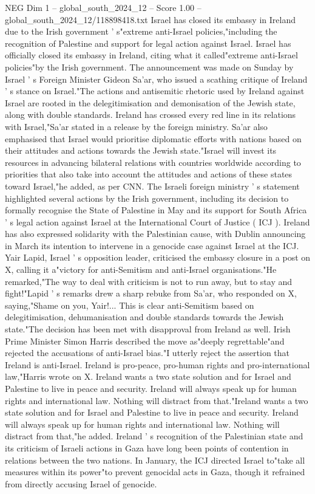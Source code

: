 \begin{textsample}{NEG Dim 1 – global\_south\_2024\_12 – Score 1.00 – global\_south\_2024\_12/118898418.txt}  \label{ex:f1_neg_346}
Israel has closed its embassy in Ireland due to the Irish government ' s"extreme anti-Israel policies,"including the recognition of Palestine and support for legal action against Israel.
Israel has officially closed its embassy in Ireland, citing what it called"extreme anti-Israel policies"by the Irish government.
The announcement was made on Sunday by Israel ' s Foreign Minister Gideon Sa'ar, who issued a scathing critique of Ireland ' s stance on Israel."The actions and antisemitic rhetoric used by Ireland against Israel are rooted in the delegitimisation and demonisation of the Jewish state, along with double standards.
Ireland has crossed every red line in its relations with Israel,"Sa'ar stated in a release by the foreign ministry.
Sa'ar also emphasised that Israel would prioritise diplomatic efforts with nations based on their attitudes and actions towards the Jewish state."Israel will invest its resources in advancing bilateral relations with countries worldwide according to priorities that also take into account the attitudes and actions of these states toward Israel,"he added, as per CNN.
The Israeli foreign ministry ' s statement highlighted several actions by the Irish government, including its decision to formally recognise the State of Palestine in May and its support for South Africa ' s legal action against Israel at the International Court of Justice ( ICJ ).
Ireland has also expressed solidarity with the Palestinian cause, with Dublin announcing in March its intention to intervene in a genocide case against Israel at the ICJ.
Yair Lapid, Israel ' s opposition leader, criticised the embassy closure in a post on X, calling it a"victory for anti-Semitism and anti-Israel organisations."He remarked,"The way to deal with criticism is not to run away, but to stay and fight!"Lapid ' s remarks drew a sharp rebuke from Sa'ar, who responded on X, saying,"Shame on you, Yair!...
This is clear anti-Semitism based on delegitimisation, dehumanisation and double standards towards the Jewish state."The decision has been met with disapproval from Ireland as well.
Irish Prime Minister Simon Harris described the move as"deeply regrettable"and rejected the accusations of anti-Israel bias."I utterly reject the assertion that Ireland is anti-Israel.
Ireland is pro-peace, pro-human rights and pro-international law,"Harris wrote on X.
Ireland wants a two state solution and for Israel and Palestine to live in peace and security.
Ireland will always speak up for human rights and international law.
Nothing will distract from that."Ireland wants a two state solution and for Israel and Palestine to live in peace and security.
Ireland will always speak up for human rights and international law.
Nothing will distract from that,"he added.
Ireland ' s recognition of the Palestinian state and its criticism of Israeli actions in Gaza have long been points of contention in relations between the two nations.
In January, the ICJ directed Israel to"take all measures within its power"to prevent genocidal acts in Gaza, though it refrained from directly accusing Israel of genocide.

\end{textsample}
